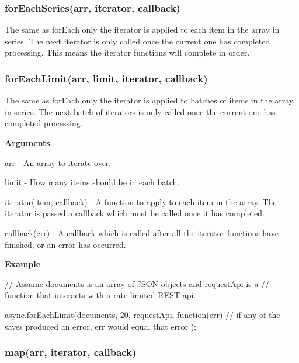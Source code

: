 \label{_forEachSeries}%
 \subsubsection*{for\+Each\+Series(arr, iterator, callback)}

The same as for\+Each only the iterator is applied to each item in the array in series. The next iterator is only called once the current one has completed processing. This means the iterator functions will complete in order.





\label{_forEachLimit}%
 \subsubsection*{for\+Each\+Limit(arr, limit, iterator, callback)}

The same as for\+Each only the iterator is applied to batches of items in the array, in series. The next batch of iterators is only called once the current one has completed processing.

{\bfseries Arguments}


\begin{DoxyItemize}
\item arr -\/ An array to iterate over.
\item limit -\/ How many items should be in each batch.
\item iterator(item, callback) -\/ A function to apply to each item in the array. The iterator is passed a callback which must be called once it has completed.
\item callback(err) -\/ A callback which is called after all the iterator functions have finished, or an error has occurred.
\end{DoxyItemize}

{\bfseries Example} \begin{DoxyVerb}// Assume documents is an array of JSON objects and requestApi is a
// function that interacts with a rate-limited REST api.

async.forEachLimit(documents, 20, requestApi, function(err){
    // if any of the saves produced an error, err would equal that error
});
\end{DoxyVerb}
 



\label{_map}%
 \subsubsection*{map(arr, iterator, callback)}

